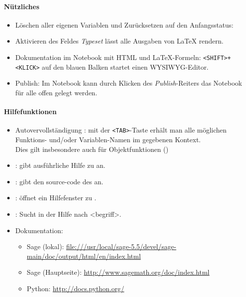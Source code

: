 \documentclass[a4paper,9pt,DIV15,twocolumn]{scrartcl}
\begin{document}
\paragraph{Nützliches}
\begin{itemize}
\item Löschen aller eigenen Variablen und Zurücksetzen auf den Anfangsstatus: {\color{blue} }
\item Aktivieren des Feldes \emph{Typeset} lässt alle Ausgaben von \LaTeX{} rendern.
\item Dokumentation im Notebook mit HTML und \LaTeX{}-Formeln: {\color{blue} \verb~<SHIFT>+<KLICK>~ }auf den blauen Balken startet einen WYSIWYG-Editor.
\item Publish: Im Notebook kann durch Klicken des \emph{Publish}-Reiters das Notebook für alle offen gelegt werden. 
\end{itemize}

\paragraph{Hilfefunktionen}
\begin{itemize}
\item {\color{blue} Autovervollständigung :} mit der {\color{blue} \verb~<TAB>~}-Taste erhält man alle möglichen Funktions- und/oder Variablen-Namen im gegebenen Kontext.\\
Dies gilt insbesondere auch für Objektfunktionen ()
\item {\color{blue}  :} gibt ausführliche Hilfe zu  an.
\item {\color{blue}  :} gibt den source-code des  an.
\item {\color{blue}  :} öffnet ein Hilfefenster zu .
\item {\color{blue}  :} Sucht in der Hilfe nach <begriff>.
\item Dokumentation:
\begin{itemize}
    \item Sage (lokal): {\small\url{file:///usr/local/sage-5.5/devel/sage-main/doc/output/html/en/index.html}}
    \item Sage (Hauptseite): {\small\url{http://www.sagemath.org/doc/index.html}}
\item Python: \url{http://docs.python.org/}
\end{itemize}
\end{itemize}
\end{document}
